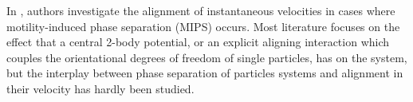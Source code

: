 \documentclass[../../master_thesis_np.tex]{subfiles}
\begin{document}
\begin{figure}[htp]
		 
		  \caption{\cite{martin-gomez_collective_2018}}
		  \label{fig:martin_flocking3}
	\end{figure}
	
	In \cite{caprini_spontaneous_2020}, authors investigate the alignment of instantaneous velocities in cases where motility-induced phase separation (MIPS) occurs. 
	Most literature focuses on the effect that a central 2-body potential, or an explicit aligning interaction which couples the orientational degrees of freedom of single particles, has on the system, but the interplay between phase separation of particles systems and alignment in their velocity has hardly been studied.
	
\end{document}
